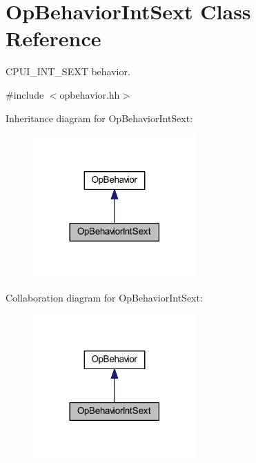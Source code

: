\hypertarget{class_op_behavior_int_sext}{}\section{Op\+Behavior\+Int\+Sext Class Reference}
\label{class_op_behavior_int_sext}


C\+P\+U\+I\+\_\+\+I\+N\+T\+\_\+\+S\+E\+XT behavior.  




{\ttfamily \#include $<$opbehavior.\+hh$>$}



Inheritance diagram for Op\+Behavior\+Int\+Sext\+:
\nopagebreak
\begin{figure}[H]
\begin{center}
\leavevmode
\includegraphics[width=177pt]{class_op_behavior_int_sext__inherit__graph}
\end{center}
\end{figure}


Collaboration diagram for Op\+Behavior\+Int\+Sext\+:
\nopagebreak
\begin{figure}[H]
\begin{center}
\leavevmode
\includegraphics[width=177pt]{class_op_behavior_int_sext__coll__graph}
\end{center}
\end{figure}
